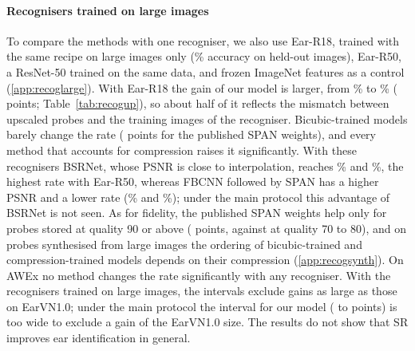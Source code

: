 \begin{table}[t]
\centering
\caption{Rank-1 rate (\%) of real small probes under the main protocol: for each method, a ResNet-18 recogniser trained on large images and on the real small images of the training subjects upscaled by that method. Differences in percentage points with 95\% confidence intervals (bootstrap over subjects); fine-tuned rows average the five fold models per probe. Upper block: bicubic upscaling, the published SPAN weights and our model; lower block: the other methods that account for compression (Table~\ref{tab:review}).}
\label{tab:recogall}
\small
{}
\end{table}

\paragraph{Recognisers trained on large images} To compare the methods with one recogniser, we also use Ear-R18, trained with the same recipe on large images only (\RecValAcc{}\% accuracy on held-out images), Ear-R50, a ResNet-50 trained on the same data, and frozen ImageNet features as a control (\ref{app:recoglarge}). With Ear-R18 the gain of our model is larger, from \RecRankBic{}\% to \RecRankEst{}\% (\RecUpEarvnLgGain{} points; Table~\ref{tab:recogup}), so about half of it reflects the mismatch between upscaled probes and the training images of the recogniser. Bicubic-trained models barely change the rate (\RecPubVsBic{} points for the published SPAN weights), and every method that accounts for compression raises it significantly. With these recognisers BSRNet, whose PSNR is close to interpolation, reaches \RevRankBsr{}\% and \RevRankBsrRf{}\%, the highest rate with Ear-R50, whereas FBCNN followed by SPAN has a higher PSNR and a lower rate (\RevRankFb{}\% and \RevRankFbRf{}\%); under the main protocol this advantage of BSRNet is not seen. As for fidelity, the published SPAN weights help only for probes stored at quality 90 or above (\RecQHighPub{} points, against \RecQLowPub{} at quality 70 to 80), and on probes synthesised from large images the ordering of bicubic-trained and compression-trained models depends on their compression (\ref{app:recogsynth}). On AWEx no method changes the rate significantly with any recogniser. With the recognisers trained on large images, the intervals exclude gains as large as those on EarVN1.0; under the main protocol the interval for our model (\RecUpAwexGainLo{} to \RecUpAwexGainHi{} points) is too wide to exclude a gain of the EarVN1.0 size. The results do not show that SR improves ear identification in general.

